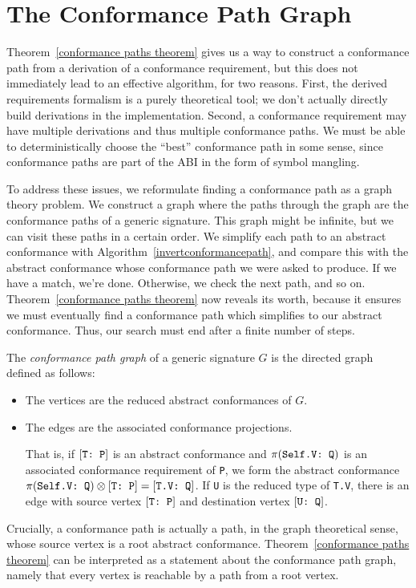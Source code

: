 \documentclass[../generics]{subfiles}
\begin{document}
\section{The Conformance Path Graph}\label{finding conformance paths}

Theorem~\ref{conformance paths theorem} gives us a way to construct a conformance path from a derivation of a conformance requirement, but this does not immediately lead to an effective algorithm, for two reasons. First, the derived requirements formalism is a purely theoretical tool; we don't actually directly build derivations in the implementation. Second, a conformance requirement may have multiple derivations and thus multiple conformance paths. We must be able to deterministically choose the ``best'' conformance path in some sense, since conformance paths are part of the ABI in the form of symbol mangling.

To address these issues, we reformulate finding a conformance path as a graph theory problem. We construct a graph where the paths through the graph are the conformance paths of a generic signature. This graph might be infinite, but we can visit these paths in a certain order. We simplify each path to an abstract conformance with Algorithm~\ref{invertconformancepath}, and compare this with the abstract conformance whose conformance path we were asked to produce. If we have a match, we're done. Otherwise, we check the next path, and so on. Theorem~\ref{conformance paths theorem} now reveals its worth, because it ensures we must eventually find a conformance path which simplifies to our abstract conformance. Thus, our search must end after a finite number of steps.

\begin{definition}
The \emph{conformance path graph} of a generic signature $G$ is the directed graph defined as follows:
\begin{itemize}
\item The vertices are the reduced abstract conformances of $G$.
\item The edges are the associated conformance projections.

That is, if $[\texttt{T:~P}]$ is an abstract conformance and $\pi(\texttt{Self.V:~Q})$ is an associated conformance requirement of \texttt{P}, we form the abstract conformance $\pi(\texttt{Self.V:~Q})\otimes [\texttt{T:~P}]=[\texttt{T.V:~Q}]$. If \texttt{U} is the reduced type of \texttt{T.V}, there is an edge with source vertex $[\texttt{T:~P}]$ and destination vertex $[\texttt{U:~Q}]$.
\end{itemize}

Crucially, a conformance path is actually a path, in the graph theoretical sense, whose source vertex is a root abstract conformance. Theorem~\ref{conformance paths theorem} can be interpreted as a statement about the conformance path graph, namely that every vertex is reachable by a path from a root vertex.
\end{definition}
\end{document}

